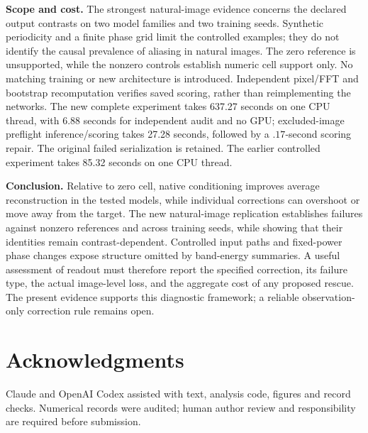 \textbf{Scope and cost.}
The strongest natural-image evidence concerns the declared output
contrasts on two model families and two training seeds. Synthetic periodicity
and a finite phase grid limit the controlled examples; they do not identify
the causal prevalence of aliasing in natural images. The zero reference
is unsupported, while the nonzero controls establish numeric cell support
only. No matching training or new architecture is introduced. Independent
pixel/FFT and bootstrap recomputation verifies saved scoring, rather than
reimplementing the networks. The new complete experiment takes 637.27
seconds on one CPU thread, with 6.88 seconds for independent audit and no
GPU; excluded-image preflight inference/scoring takes 27.28 seconds, followed
by a $.17$-second scoring repair. The original failed serialization is retained.
The earlier controlled experiment takes 85.32 seconds on one CPU thread.

\textbf{Conclusion.}
Relative to zero cell, native conditioning improves average reconstruction
in the tested models,
while individual corrections can overshoot or move away from the target.
The new natural-image replication establishes failures against nonzero
references and across training seeds, while showing that their identities
remain contrast-dependent. Controlled input paths and fixed-power phase
changes expose structure omitted by band-energy summaries. A useful
assessment of readout must therefore report the specified correction,
its failure type, the actual image-level loss, and the aggregate cost of
any proposed rescue. The present evidence supports this diagnostic
framework; a reliable observation-only correction rule remains open.

\section{Acknowledgments}
Claude and OpenAI Codex assisted with text, analysis code, figures and
record checks. Numerical records were audited; human author review and
responsibility are required before submission.
